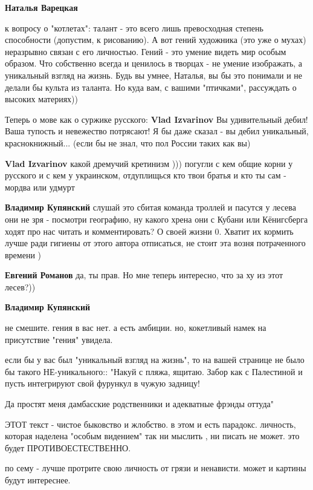 \begin{itemize}
\begin{itemize}
\textbf{Наталья Варецкая} 

к вопросу о "котлетах": талант - это всего лишь превосходная степень
способности (допустим, к рисованию). А вот гений художника (это уже о мухах)
неразрывно связан с его личностью. Гений - это умение видеть мир особым
образом. Что собственно всегда и ценилось в творцах - не умение изображать, а
уникальный взгляд на жизнь. Будь вы умнее, Наталья, вы бы это понимали и не
делали бы культа из таланта. Но куда вам, с вашими "птичками", рассуждать о
высоких материях))


Теперь о мове как о суржике русского: \textbf{Vlad Izvarinov} Вы удивительный дебил!
Ваша тупость и невежество потрясают! Я бы даже сказал - вы дебил уникальный,
краснокнижный... (если бы не знал, что пол России таких как вы)


\textbf{Vlad Izvarinov} какой дремучий кретинизм ))) погугли с кем общие корни у русского и с кем у украинском, отдуплищься кто твои братья и кто ты сам - мордва или удмурт

\textbf{Владимир Купянский} слушай это сбитая команда троллей и пасутся у лесева они не зря - посмотри географию, ну какого хрена они с Кубани или Кёнигсберга ходят про нас читать и комментировать? О своей жизни 0. Хватит их кормить лучше ради гигиены от этого автора отписаться, не стоит эта возня потраченного времени )

\textbf{Евгений Романов} да, ты прав. Но мне теперь интересно, что за ху из этот лесев?))

\textbf{Владимир Купянский} 

не смешите. гения в вас нет. а есть амбиции. но, кокетливый намек на
присутствие "гения" увидела.

если бы у вас был "уникальный взгляд на жизнь", то на вашей странице не было бы
такого НЕ-уникального:: "Накуй с пляжа, ящитаю. Забор как с Палестиной и пусть
интегрируют свой фурункул в чужую задницу!

Да простят меня дамбасские родственники и адекватные фрэнды оттуда"

ЭТОТ текст - чистое быковство и жлобство. в этом и есть парадокс. личность,
которая наделена "особым видением" так ни мыслить , ни писать не может. это
будет ПРОТИВОЕСТЕСТВЕННО.

по сему - лучше протрите свою личность от грязи и ненависти. может и картины
будут интереснее.


\end{itemize}
\end{itemize}
